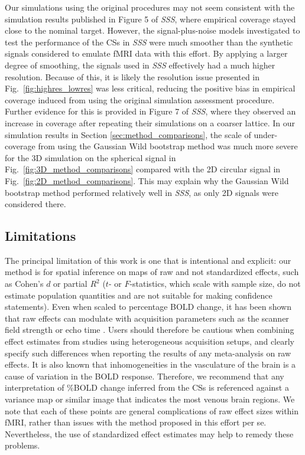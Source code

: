 Our simulations using the original procedures may not seem consistent with the simulation results published in Figure 5 of \textit{SSS}, where empirical coverage stayed close to the nominal target. However, the signal-plus-noise models investigated to test the performance of the CSs in \textit{SSS} were much smoother than the synthetic signals considered to emulate fMRI data with this effort. By applying a larger degree of smoothing, the signals used in \textit{SSS} effectively had a much higher resolution. Because of this, it is likely the resolution issue presented in Fig.\ \ref{fig:highres_lowres} was less critical, reducing the positive bias in empirical coverage induced from using the original simulation assessment procedure. Further evidence for this is provided in Figure 7 of \textit{SSS}, where they observed an increase in coverage after repeating their simulations on a coarser lattice. In our simulation results in Section \ref{sec:method_comparisons}, the scale of under-coverage from using the Gaussian Wild bootstrap method was much more severe for the 3D simulation on the spherical signal in Fig.\ \ref{fig:3D_method_comparisons} compared with the 2D circular signal in Fig.\ \ref{fig:2D_method_comparisons}. This may explain why the Gaussian Wild bootstrap method performed relatively well in \textit{SSS}, as only 2D signals were considered there. 

\subsection{Limitations}

The principal limitation of this work is one that is intentional and explicit: our method is for spatial inference on maps of raw and not standardized effects, such as Cohen's $d$ or partial $R^{2}$ ($t$- or $F$-statistics, which scale with sample size, do not estimate population quantities and are not suitable for making  confidence statements). Even when scaled to percentage BOLD change, it has been shown that raw effects can modulate with acquisition parameters such as the scanner field strength or echo time \citep{UIudag2009-nm}. Users should therefore be cautious when combining effect estimates from studies using heterogeneous acquisition setups, and clearly specify such differences when reporting the results of any meta-analysis on raw effects. It is also known that inhomogeneities in the vasculature of the brain is a cause of variation in the BOLD response. Therefore, we recommend that any interpretation of \%BOLD change inferred from the CSs is referenced against a variance map or similar image that indicates the most venous brain regions. We note that each of these points are general complications of raw effect sizes within fMRI, rather than issues with the method proposed in this effort per se. Nevertheless, the use of standardized effect estimates may help to remedy these problems.

